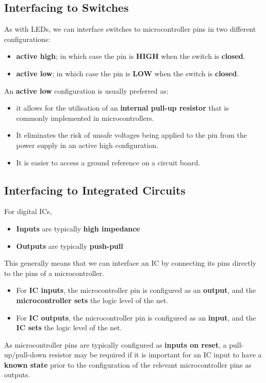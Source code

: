 \documentclass{report}
\begin{document}
\subsection{Interfacing to Switches}
As with LEDs, we can interface switches to microcontroller pins in two different configurations:
\begin{itemize}
    \item \textbf{active high}; in which case the pin is \textbf{HIGH} when the switch is \textbf{closed}.
    \item \textbf{active low}; in which case the pin is \textbf{LOW} when the switch is \textbf{closed}.
\end{itemize}
An \textbf{active low} configuration is usually preferred as:
\begin{itemize}
    \item it allows for the utilisation of an \textbf{internal pull-up resistor} that is commonly
          implemented in microcontrollers.
    \item It eliminates the risk of unsafe voltages being applied to the pin from the power supply in an active high configuration.
    \item It is easier to access a ground reference on a circuit board.
\end{itemize}
\subsection{Interfacing to Integrated Circuits}
For digital ICs,
\begin{itemize}
    \item \textbf{Inputs} are typically \textbf{high impedance}
    \item \textbf{Outputs} are typically \textbf{push-pull}
\end{itemize}
This generally means that we can interface an IC by connecting its pins directly to the pins of a microcontroller.
\begin{itemize}
    \item For \textbf{IC inputs}, the microcontroller pin is configured as an \textbf{output},
          and the \textbf{microcontroller sets} the logic level of the net.
    \item For \textbf{IC outputs}, the microcontroller pin is configured as an \textbf{input},
          and the \textbf{IC sets} the logic level of the net.
\end{itemize}
As microcontroller pins are typically configured as \textbf{inputs on reset}, a
pull-up/pull-down resistor may be required if it is important for an IC input to
have a \textbf{known state} prior to the configuration of the relevant microcontroller pins as outputs.
\end{document}
